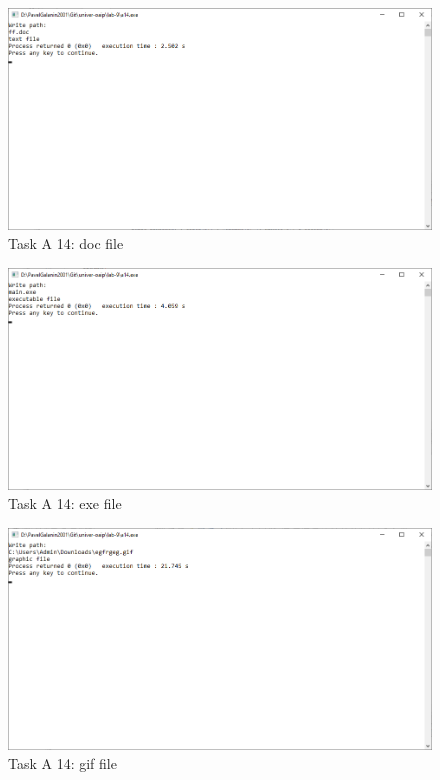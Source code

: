 \documentclass[12pt,a4paper]{article}
\begin{document}
\begin{figure}[ht]
  \centering
  \includegraphics[width=16cm]{imgs/a14doc.png}
  \caption{Task A 14: doc file}
  \label{fig:a14-doc}
\end{figure}

\begin{figure}[ht]
  \centering
  \includegraphics[width=16cm]{imgs/a14exe.png}
  \caption{Task A 14: exe file}
  \label{fig:a14-exe}
\end{figure}

\begin{figure}[ht]
  \centering
  \includegraphics[width=16cm]{imgs/a14gif.png}
  \caption{Task A 14: gif file}
  \label{fig:a14-gif}
\end{figure}
\end{document}
